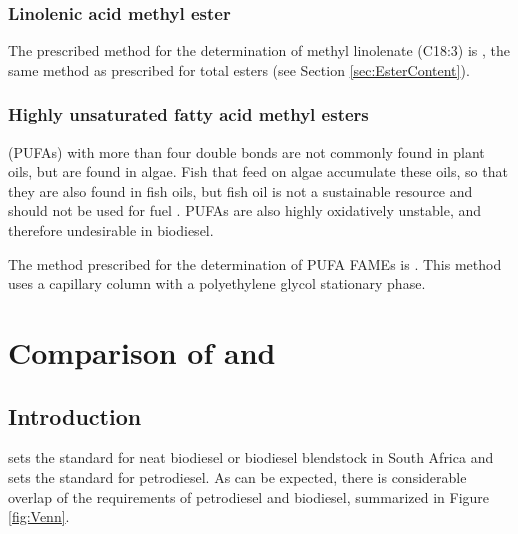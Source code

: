 \subsubsection{Linolenic acid methyl ester}

The prescribed method for the determination of methyl linolenate (C18:3) is
, the same method as prescribed for total esters (see Section
\ref{sec:EsterContent}).

\subsubsection{Highly unsaturated fatty acid methyl esters}

 (PUFAs) with more than four double bonds are
not commonly found in plant oils, but are found in algae. Fish that feed on
algae accumulate these oils, so that they are also found in fish oils, but fish
oil is not a sustainable resource and should not be used for fuel
\autocite{Kitessa2014}. PUFAs are also highly oxidatively unstable, and
therefore undesirable in biodiesel.

The method prescribed for the determination of PUFA FAMEs is .
This method uses a capillary column with a polyethylene glycol stationary phase.

\section{Comparison of \texorpdfstring{}{SANS 1935} and \texorpdfstring{}{SANS 342}}

\subsection{Introduction}
\label{sec:Comparison}

 sets the standard for neat biodiesel or biodiesel blendstock in
South Africa and  sets the standard for petrodiesel. As can be
expected, there is considerable overlap of the requirements of petrodiesel and
biodiesel, summarized in Figure \ref{fig:Venn}.

